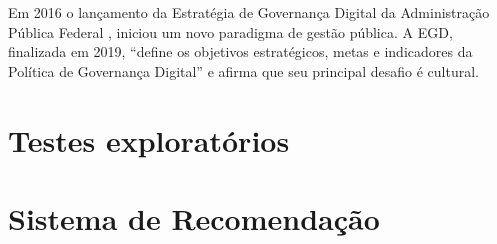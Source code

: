 Em 2016 o lançamento da Estratégia de Governança Digital da Administração Pública Federal \cite{BRASIL}, iniciou um novo paradigma de gestão pública. A EGD, finalizada em 2019,
“define os objetivos estratégicos, metas e indicadores da Política de Governança Digital” e afirma que seu principal desafio é cultural.


\section{Testes exploratórios}


\section{Sistema de Recomendação}
